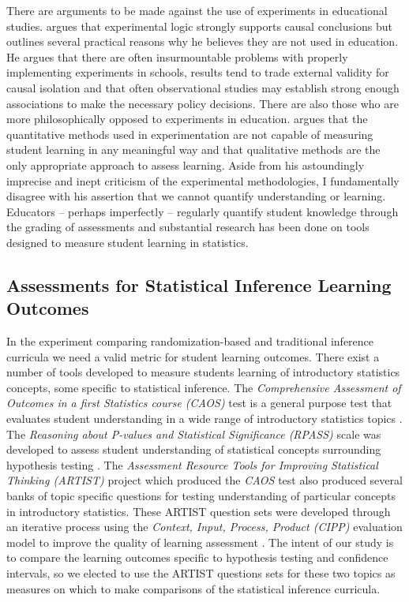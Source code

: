 There are arguments to be made against the use of experiments in educational studies. \citet{Cook2002} argues that experimental logic strongly supports causal conclusions but outlines several practical reasons why he believes they are not used in education.  He argues that there are often insurmountable problems with properly implementing experiments in schools, results tend to trade external validity for causal isolation and that often observational studies may establish strong enough associations to make the necessary policy decisions. There are also those who are more philosophically opposed to experiments in education. \citet{Howe2004} argues that the quantitative methods used in experimentation are not capable of measuring student learning in any meaningful way and that qualitative methods are the only appropriate approach to assess learning. Aside from his astoundingly imprecise and inept criticism of the experimental methodologies, I fundamentally disagree with his assertion that we cannot quantify understanding or learning. Educators -- perhaps imperfectly -- regularly quantify student knowledge through the grading of assessments and substantial research has been done on tools designed to measure student learning in statistics.

\subsection{Assessments for Statistical Inference Learning Outcomes} 

In the experiment comparing randomization-based and traditional inference curricula we need a valid metric for student learning outcomes. There exist a number of tools developed to measure students learning of introductory statistics concepts, some specific to statistical inference. The \textit{Comprehensive Assessment of Outcomes in a first Statistics course (CAOS)} test is a general purpose test that evaluates student understanding in a wide range of introductory statistics topics \citep{DelMas2007}. The \textit{Reasoning about P-values and Statistical Significance (RPASS)} scale was developed to assess student understanding of statistical concepts surrounding hypothesis testing \citep{LaneGetaz2013}. The \textit{Assessment Resource Tools for Improving Statistical Thinking (ARTIST)} project which produced the \textit{CAOS} test also produced several banks of topic specific questions for testing understanding of particular concepts in introductory statistics. These ARTIST question sets were developed through an iterative process using the \textit{Context, Input, Process, Product (CIPP)} evaluation model to improve the quality of learning assessment \citep{Ooms2008}. The intent of our study is to compare the learning outcomes specific to hypothesis testing and confidence intervals, so we elected to use the ARTIST questions sets for these two topics as measures on which to make comparisons of the statistical inference curricula. 

